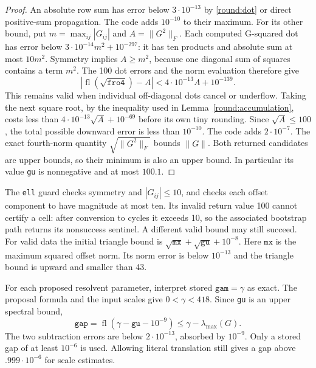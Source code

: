 \begin{proof}
An absolute row sum has error below $3\cdot10^{-13}$ by
\eqref{round:dot} or direct positive-sum propagation.  The code adds
$10^{-10}$ to their maximum.
For its other bound, put $m=\max_{ij}|G_{ij}|$ and $A=\|G^2\|_F$.
Each computed G-squared dot has error below
$3\cdot10^{-14}m^2+10^{-297}$: it has ten products and absolute sum
at most $10m^2$.
Symmetry implies $A\ge m^2$, because one diagonal sum of squares
contains a term $m^2$.  The 100 dot errors and the norm evaluation
therefore give
\[
 |\operatorname{fl}(\sqrt{\mathtt{fro4}})-A|
       <4\cdot10^{-13}A+10^{-139}.
\]
This remains valid when individual off-diagonal dots cancel or
underflow.  Taking the next square root, by the inequality used in
Lemma~\ref{round:accumulation}, costs less than
$4\cdot10^{-13}\sqrt A+10^{-69}$ before its own tiny rounding.
Since $\sqrt A\le100$, the total possible downward error is less
than $10^{-10}$.  The code adds $2\cdot10^{-7}$.
The exact fourth-norm quantity $\sqrt{\|G^2\|_F}$ bounds $\|G\|$.
Both returned candidates are upper bounds, so their minimum is also
an upper bound.  In particular its value \texttt{gu} is nonnegative
and at most $100.1$.
\end{proof}

The \texttt{ell} guard checks symmetry and $|G_{ij}|\le10$, and checks
each offset component to have magnitude at most ten.  Its invalid
return value 100 cannot certify a cell: after conversion to cycles
it exceeds 10, so the associated bootstrap path returns its
nonsuccess sentinel.  A different valid bound may still succeed.
For valid data the initial triangle bound is
$\sqrt{\mathtt{mx}}+\sqrt{\mathtt{gu}}+10^{-8}$.
Here $\mathtt{mx}$ is the maximum squared offset norm.  Its norm
error is below $10^{-13}$ and the triangle bound is upward and
smaller than 43.

For each proposed resolvent parameter, interpret stored
$\mathtt{gam}=\gamma$ as exact.  The proposal formula and the input
scales give $0<\gamma<418$.  Since \texttt{gu} is an upper spectral
bound,
\begin{equation}\label{round:gap}
 \mathtt{gap}=\operatorname{fl}(\gamma-\mathtt{gu}-10^{-9})
       \le\gamma-\lambda_{\max}(G).
\end{equation}
The two subtraction errors are below $2\cdot10^{-13}$, absorbed by
$10^{-9}$.  Only a stored gap of at least $10^{-6}$ is used.
Allowing literal translation still gives a gap above
$.999\cdot10^{-6}$ for scale estimates.

